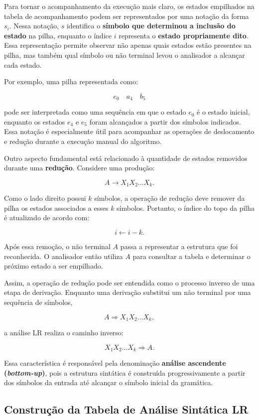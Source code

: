 \documentclass[
  brazilian,
  letterpaper,
]{book}
\theoremstyle{plain}
\theoremstyle{definition}
\theoremstyle{remark}
\begin{document}
Para tornar o acompanhamento da execução mais claro, os estados
empilhados na tabela de acompanhamento podem ser representados por uma
notação da forma \(s_i\). Nessa notação, \(s\) identifica o
\textbf{símbolo que determinou a inclusão do estado} na pilha, enquanto
o índice \(i\) representa o \textbf{estado propriamente dito}. Essa
representação permite observar não apenas quais estados estão presentes
na pilha, mas também qual símbolo ou não terminal levou o analisador a
alcançar cada estado.

Por exemplo, uma pilha representada como:

\[
e_0\quad a_4\quad b_5
\]

pode ser interpretada como uma sequência em que o estado \(e_0\) é o
estado inicial, enquanto os estados \(e_4\) e \(e_5\) foram alcançados a
partir dos símbolos indicados. Essa notação é especialmente útil para
acompanhar as operações de deslocamento e redução durante a execução
manual do algoritmo.

Outro aspecto fundamental está relacionado à quantidade de estados
removidos durante uma \textbf{redução}. Considere uma produção:

\[
A\rightarrow X_1X_2\ldots X_k.
\]

Como o lado direito possui \(k\) símbolos, a operação de redução deve
remover da pilha os estados associados a esses \(k\) símbolos. Portanto,
o índice do topo da pilha é atualizado de acordo com:

\[
i\leftarrow i-k.
\]

Após essa remoção, o não terminal \(A\) passa a representar a estrutura
que foi reconhecida. O analisador então utiliza \(A\) para consultar a
tabela e determinar o próximo estado a ser empilhado.

Assim, a operação de redução pode ser entendida como o processo inverso
de uma etapa de derivação. Enquanto uma derivação substitui um não
terminal por uma sequência de símbolos,

\[
A\Rightarrow X_1X_2\ldots X_k,
\]

a análise LR realiza o caminho inverso:

\[
X_1X_2\ldots X_k\Rightarrow A.
\]

Essa característica é responsável pela denominação \textbf{análise
ascendente (\emph{bottom-up})}, pois a estrutura sintática é construída
progressivamente a partir dos símbolos da entrada até alcançar o símbolo
inicial da gramática.

\subsection{Construção da Tabela de Análise Sintática
LR}\label{construuxe7uxe3o-da-tabela-de-anuxe1lise-sintuxe1tica-lr}
\end{document}
